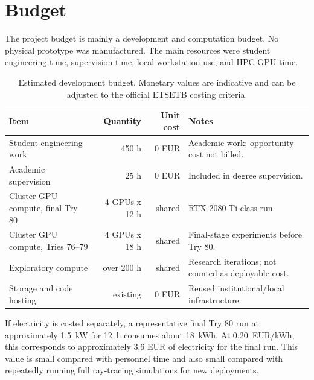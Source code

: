 \chapter{Budget}

The project budget is mainly a development and computation budget. No physical
prototype was manufactured. The main resources were student engineering time,
supervision time, local workstation use, and HPC GPU time.

\begin{table}[ht]
\centering
\caption{Estimated development budget. Monetary values are indicative and can
be adjusted to the official ETSETB costing criteria.}
\label{tab:budget}
\begin{tabularx}{\textwidth}{lrrX}
\toprule
Item & Quantity & Unit cost & Notes \\
\midrule
Student engineering work & 450 h & 0 EUR & Academic work; opportunity cost not billed. \\
Academic supervision & 25 h & 0 EUR & Included in degree supervision. \\
Cluster GPU compute, final Try 80 & 4 GPUs x 12 h & shared & RTX 2080 Ti-class run. \\
Cluster GPU compute, Tries 76--79 & 4 GPUs x 18 h & shared & Final-stage experiments before Try 80. \\
Exploratory compute & over 200 h & shared & Research iterations; not counted as deployable cost. \\
Storage and code hosting & existing & 0 EUR & Reused institutional/local infrastructure. \\
\bottomrule
\end{tabularx}
\end{table}

If electricity is costed separately, a representative final Try 80 run at
approximately \SI{1.5}{kW} for \SI{12}{h} consumes about \SI{18}{kWh}. At
\SI{0.20}{EUR/kWh}, this corresponds to approximately 3.6 EUR of electricity
for the final run. This value is small compared with personnel time and also
small compared with repeatedly running full ray-tracing simulations for new
deployments.
